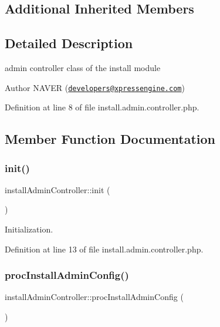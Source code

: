 \subsection*{Additional Inherited Members}


\subsection{Detailed Description}
admin controller class of the install module 

\begin{DoxyAuthor}{Author}
N\+A\+V\+ER (\href{mailto:developers@xpressengine.com}{\tt developers@xpressengine.\+com}) 
\end{DoxyAuthor}


Definition at line 8 of file install.\+admin.\+controller.\+php.



\subsection{Member Function Documentation}
\hypertarget{classinstallAdminController_a3eda4638a74c9a92eba2803c1beff6a3}{}\label{classinstallAdminController_a3eda4638a74c9a92eba2803c1beff6a3} 
\subsubsection{\texorpdfstring{init()}{init()}}
{\footnotesize\ttfamily install\+Admin\+Controller\+::init (\begin{DoxyParamCaption}{ }\end{DoxyParamCaption})}



Initialization. 



Definition at line 13 of file install.\+admin.\+controller.\+php.

\hypertarget{classinstallAdminController_a57d9a607291587b656246beca9fd51fe}{}\label{classinstallAdminController_a57d9a607291587b656246beca9fd51fe} 
\subsubsection{\texorpdfstring{proc\+Install\+Admin\+Config()}{procInstallAdminConfig()}}
{\footnotesize\ttfamily install\+Admin\+Controller\+::proc\+Install\+Admin\+Config (\begin{DoxyParamCaption}{ }\end{DoxyParamCaption})}



